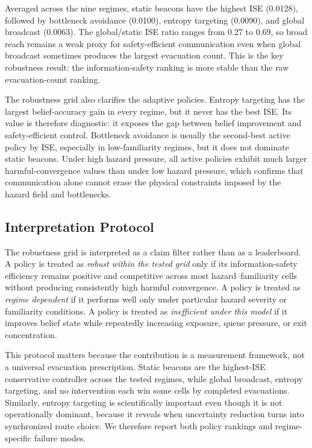 Averaged across the nine regimes, static beacons have the highest ISE
(0.0128), followed by bottleneck avoidance (0.0100), entropy targeting
(0.0090), and global broadcast (0.0063). The global/static ISE ratio ranges
from 0.27 to 0.69, so broad reach remains a weak proxy for safety-efficient
communication even when global broadcast sometimes produces the largest
evacuation count. This is the key robustness result: the information-safety
ranking is more stable than the raw evacuation-count ranking.

The robustness grid also clarifies the adaptive policies. Entropy targeting
has the largest belief-accuracy gain in every regime, but it never has the
best ISE. Its value is therefore diagnostic: it exposes the gap between belief
improvement and safety-efficient control. Bottleneck avoidance is usually the
second-best active policy by ISE, especially in low-familiarity regimes, but it
does not dominate static beacons. Under high hazard pressure, all active
policies exhibit much larger harmful-convergence values than under low hazard
pressure, which confirms that communication alone cannot erase the physical
constraints imposed by the hazard field and bottlenecks.

\subsection{Interpretation Protocol}
\label{subsec:robustness-interpretation}

The robustness grid is interpreted as a claim filter rather than as a
leaderboard. A policy is treated as \emph{robust within the tested grid} only
if its information-safety efficiency remains positive and competitive across
most hazard--familiarity cells without producing consistently high harmful
convergence. A policy is treated as \emph{regime dependent} if it performs
well only under particular hazard severity or familiarity conditions. A policy
is treated as \emph{inefficient under this model} if it improves belief state
while repeatedly increasing exposure, queue pressure, or exit concentration.

This protocol matters because the contribution is a measurement framework, not
a universal evacuation prescription. Static beacons are the highest-ISE
conservative controller across the tested regimes, while global broadcast,
entropy targeting, and no intervention each win some cells by completed
evacuations. Similarly, entropy targeting is scientifically important even
though it is not operationally dominant, because it reveals when uncertainty
reduction turns into synchronized route choice. We therefore report both policy
rankings and regime-specific failure modes.


